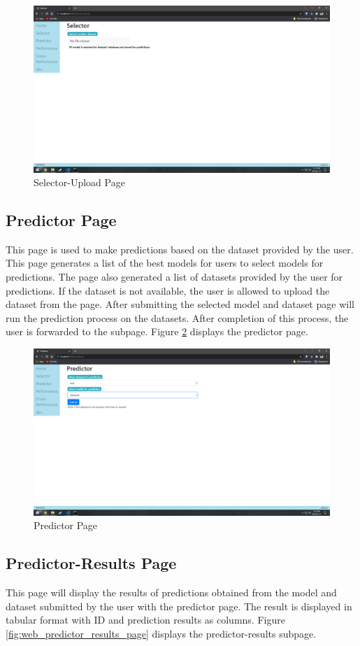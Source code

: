\begin{figure}[H]
    \centering
    \includegraphics[width=0.7\columnwidth]{media/website/pages/02_selector_upload.png}
    \caption{Selector-Upload Page}
    \label{fig:web_selector_upload_page}
\end{figure}

\subsection{Predictor Page} \label{subsec:predictor_page}
This page is used to make predictions based on the dataset provided by the user. This page
generates a list of the best models for users to select models for predictions. The page also
generated a list of datasets provided by the user for predictions. If the dataset is not
available, the user is allowed to upload the dataset from the page. After submitting the
selected model and dataset page will run the prediction process on the datasets. After
completion of this process, the user is forwarded to the subpage. Figure
\ref{fig:web_predictor_page} displays the predictor page.

\begin{figure}[H]
    \centering
    \includegraphics[width=0.7\columnwidth]{media/website/pages/03_predictor.png}
    \caption{Predictor Page}
    \label{fig:web_predictor_page}
\end{figure}

\subsection{Predictor-Results Page} \label{subsec:predictor_result_page}
This page will display the results of predictions obtained from the model and dataset submitted
by the user with the predictor page. The result is displayed in tabular format with ID and
prediction results as columns. Figure \ref{fig:web_predictor_results_page} displays the
predictor-results subpage.


